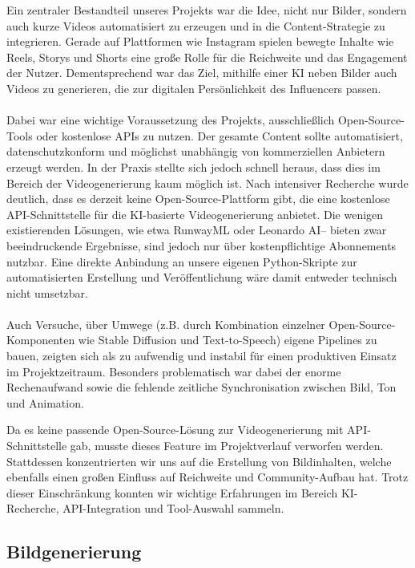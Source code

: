 \documentclass[a4paper,12pt]{article}
\begin{document}
Ein zentraler Bestandteil unseres Projekts war die Idee, nicht nur Bilder, sondern auch kurze Videos automatisiert zu erzeugen und in die Content-Strategie zu integrieren. Gerade auf Plattformen wie Instagram spielen bewegte Inhalte wie Reels, Storys und Shorts eine große Rolle für die Reichweite und das Engagement der Nutzer. Dementsprechend war das Ziel, mithilfe einer KI neben Bilder auch Videos zu generieren, die zur digitalen Persönlichkeit des Influencers passen. \\\\
Dabei war eine wichtige Voraussetzung des Projekts, ausschließlich Open-Source-Tools oder kostenlose APIs zu nutzen. Der gesamte Content sollte automatisiert, datenschutzkonform und möglichst unabhängig von kommerziellen Anbietern erzeugt werden. In der Praxis stellte sich jedoch schnell heraus, dass dies im Bereich der Videogenerierung kaum möglich ist.
Nach intensiver Recherche wurde deutlich, dass es derzeit keine Open-Source-Plattform gibt, die eine kostenlose API-Schnittstelle für die KI-basierte Videogenerierung anbietet. Die wenigen existierenden Lösungen, wie etwa RunwayML oder Leonardo AI– bieten zwar beeindruckende Ergebnisse, sind jedoch nur über kostenpflichtige Abonnements nutzbar. Eine direkte Anbindung an unsere eigenen Python-Skripte zur automatisierten Erstellung und Veröffentlichung wäre damit entweder technisch nicht umsetzbar. \\\\
Auch Versuche, über Umwege (z.B. durch Kombination einzelner Open-Source-Komponenten wie Stable Diffusion und Text-to-Speech) eigene Pipelines zu bauen, zeigten sich als zu aufwendig und instabil für einen produktiven Einsatz im Projektzeitraum. Besonders problematisch war dabei der enorme Rechenaufwand sowie die fehlende zeitliche Synchronisation zwischen Bild, Ton und Animation.

Da es keine passende Open-Source-Lösung zur Videogenerierung mit API-Schnittstelle gab, musste dieses Feature im Projektverlauf verworfen werden. Stattdessen konzentrierten wir uns auf die Erstellung von Bildinhalten, welche ebenfalls einen großen Einfluss auf Reichweite und Community-Aufbau hat. Trotz dieser Einschränkung konnten wir wichtige Erfahrungen im Bereich KI-Recherche, API-Integration und Tool-Auswahl sammeln.

\subsection{Bildgenerierung}
\end{document}
